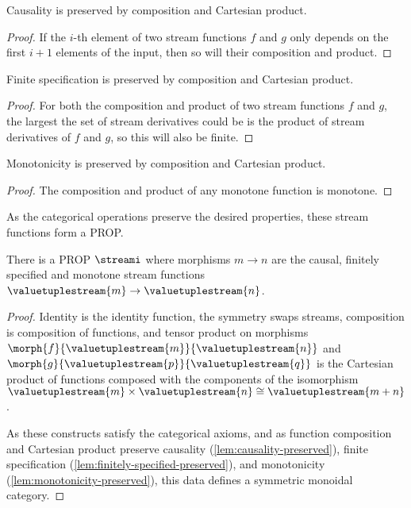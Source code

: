 \begin{lemma}\label{lem:causality-preserved}
    Causality is preserved by composition and Cartesian product.
\end{lemma}
\begin{proof}
    If the \(i\)-th element of two stream functions \(f\) and \(g\) only depends
    on the first \(i+1\) elements of the input, then so will their composition
    and product.
\end{proof}

\begin{lemma}\label{lem:finitely-specified-preserved}
    Finite specification is preserved by composition and Cartesian
    product.
\end{lemma}
\begin{proof}
    For both the composition and product of two stream functions \(f\) and
    \(g\), the largest the set of stream derivatives could be is the product of
    stream derivatives of \(f\) and \(g\), so this will also be finite.
\end{proof}

\begin{lemma}\label{lem:monotonicity-preserved}
    Monotonicity is preserved by composition and Cartesian product.
\end{lemma}
\begin{proof}
    The composition and product of any monotone function is monotone.
\end{proof}

As the categorical operations preserve the desired properties, these stream
functions form a PROP.

\begin{proposition}
    There is a PROP \(\streami\) where morphisms \(m \to n\) are the causal,
    finitely specified and monotone stream functions \(
    \valuetuplestream{m} \to \valuetuplestream{n}
    \).
\end{proposition}
\begin{proof}
    Identity is the identity function, the symmetry swaps streams, composition
    is composition of functions, and tensor product on morphisms
    \(\morph{f}{\valuetuplestream{m}}{\valuetuplestream{n}}\) and
    \(\morph{g}{\valuetuplestream{p}}{\valuetuplestream{q}}\) is the Cartesian
    product of functions composed with the components of the isomorphism
    \(\valuetuplestream{m} \times \valuetuplestream{n}
    \cong \valuetuplestream{m+n}\).

    As these constructs satisfy the categorical axioms, and as function
    composition and Cartesian product preserve causality
    (\cref{lem:causality-preserved}),
    finite specification (\cref{lem:finitely-specified-preserved}),
    and monotonicity (\cref{lem:monotonicity-preserved}), this data defines a
    symmetric monoidal category.
\end{proof}

